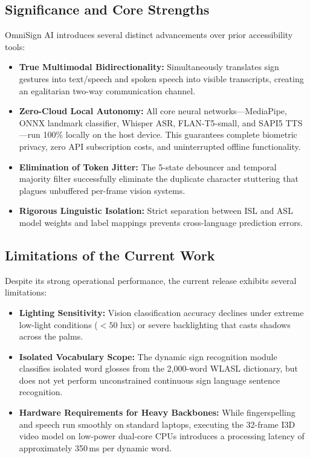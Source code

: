 \documentclass[12pt,a4paper]{report}
\begin{document}
\subsection{Significance and Core Strengths}
OmniSign AI introduces several distinct advancements over prior accessibility tools:
\begin{itemize}[noitemsep, topsep=2pt]
\item \textbf{True Multimodal Bidirectionality:} Simultaneously translates sign gestures into text/speech and spoken speech into visible transcripts, creating an egalitarian two-way communication channel.
\item \textbf{Zero-Cloud Local Autonomy:} All core neural networks---MediaPipe, ONNX landmark classifier, Whisper ASR, FLAN-T5-small, and SAPI5 TTS---run 100\% locally on the host device. This guarantees complete biometric privacy, zero API subscription costs, and uninterrupted offline functionality.
\item \textbf{Elimination of Token Jitter:} The 5-state debouncer and temporal majority filter successfully eliminate the duplicate character stuttering that plagues unbuffered per-frame vision systems.
\item \textbf{Rigorous Linguistic Isolation:} Strict separation between ISL and ASL model weights and label mappings prevents cross-language prediction errors.
\end{itemize}

\subsection{Limitations of the Current Work}
Despite its strong operational performance, the current release exhibits several limitations:
\begin{itemize}[noitemsep, topsep=2pt]
\item \textbf{Lighting Sensitivity:} Vision classification accuracy declines under extreme low-light conditions ($<50$ lux) or severe backlighting that casts shadows across the palms.
\item \textbf{Isolated Vocabulary Scope:} The dynamic sign recognition module classifies isolated word glosses from the 2,000-word WLASL dictionary, but does not yet perform unconstrained continuous sign language sentence recognition.
\item \textbf{Hardware Requirements for Heavy Backbones:} While fingerspelling and speech run smoothly on standard laptops, executing the 32-frame I3D video model on low-power dual-core CPUs introduces a processing latency of approximately 350\,ms per dynamic word.
\end{itemize}
\end{document}
